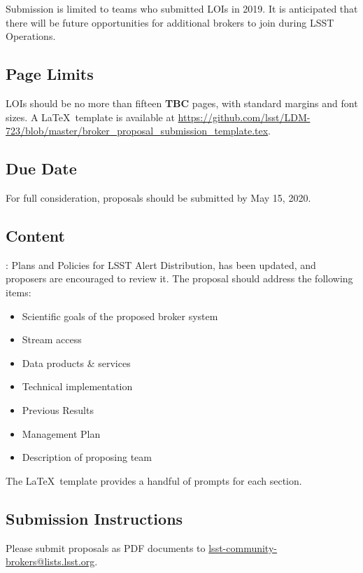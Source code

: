 \documentclass[DM,toc,lsstdraft]{lsstdoc}
\begin{document}
Submission is limited to teams who submitted LOIs in 2019.
It is anticipated that there will be future opportunities for additional brokers to join during LSST Operations.

\subsection{Page Limits}

LOIs should be no more than fifteen \textbf{TBC} pages, with standard margins and font sizes.
A \LaTeX\ template is available at \url{https://github.com/lsst/LDM-723/blob/master/broker_proposal_submission_template.tex}.

\subsection{Due Date}

For full consideration, proposals should be submitted by May 15, 2020.

\subsection{Content}


: Plans and Policies for LSST Alert Distribution, has been updated, and proposers are encouraged to review it.
The proposal should address the following items:

\begin{itemize}
	\item Scientific goals of the proposed broker system
	\item Stream access 
	\item Data products \& services
	\item Technical implementation
	\item Previous Results
	\item Management Plan
	\item Description of proposing team
\end{itemize}

The \LaTeX\ template provides a handful of prompts for each section.

\subsection{Submission Instructions}

Please submit proposals as PDF documents to \url{lsst-community-brokers@lists.lsst.org}.
\end{document}

